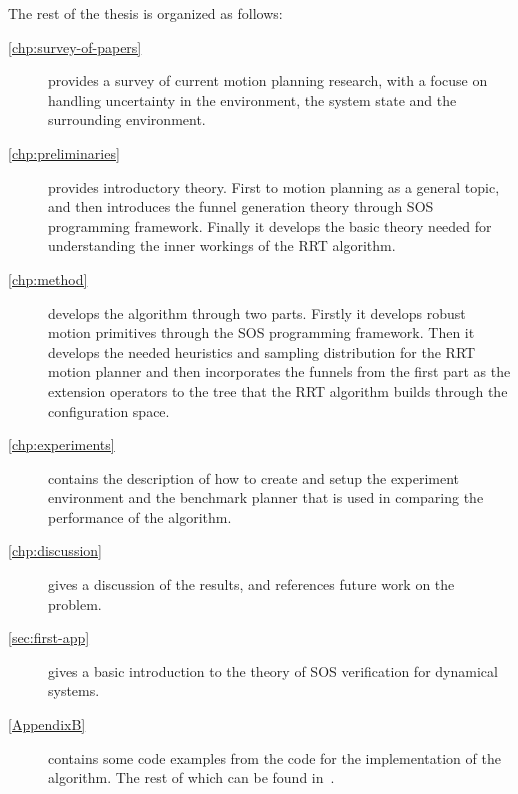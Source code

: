 The rest of the thesis is organized as follows:
\begin{description}

\item[\cref{chp:survey-of-papers}] provides a survey of current motion planning
  research, with a focuse on handling uncertainty in the environment, the system
  state and the surrounding environment.    

\item[\cref{chp:preliminaries}] provides introductory theory. First to motion
  planning as a general topic, and then introduces the funnel generation theory
  through \ac{SOS} programming framework. Finally it develops the basic theory
  needed for understanding the inner workings of the \ac{RRT} algorithm.
    
\item[\cref{chp:method}] develops the \rrtfunnel{} algorithm through two parts.
  Firstly it develops robust motion primitives through the \ac{SOS} programming
  framework. Then it develops the needed heuristics and sampling distribution
  for the \ac{RRT} motion planner and then incorporates the funnels from the
  first part as the extension operators to the tree that the \ac{RRT} algorithm
  builds through the configuration space.
    
\item[\cref{chp:experiments}] contains the description of how to create and
  setup the experiment environment and the benchmark planner that is used in
  comparing the performance of the \rrtfunnel{} algorithm.

\item[\cref{chp:discussion}] gives a discussion of the results, and references
  future work on the problem.

\item[\cref{sec:first-app}] gives a basic introduction to the theory of \ac{SOS}
  verification for dynamical systems.

\item[\cref{AppendixB}] contains some code examples from the code for the
  implementation of the \rrtfunnel{} algorithm. The rest of which can be found
  in~\cite{MasterThesisCode2019}.

\end{description}


